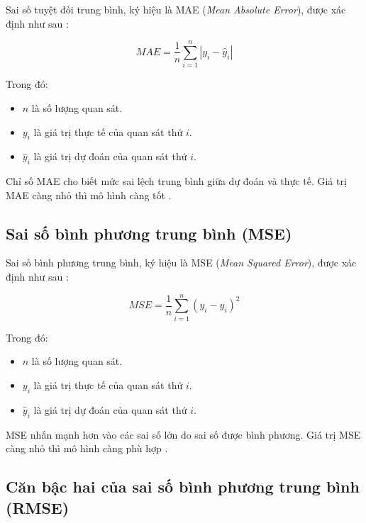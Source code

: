 Sai số tuyệt đối trung bình, ký hiệu là MAE (\textit{Mean Absolute Error}), được xác định như sau \cite{sklearn_userguide}:

\begin{equation}
MAE = \frac{1}{n} \sum_{i=1}^{n} \left| y_i - \hat{y}_i \right|
\label{eq:mae}
\end{equation}

Trong đó:
\begin{itemize}
    \item \(n\) là số lượng quan sát.
    \item \(y_i\) là giá trị thực tế của quan sát thứ \(i\).
    \item \(\hat{y}_i\) là giá trị dự đoán của quan sát thứ \(i\).
\end{itemize}

Chỉ số MAE cho biết mức sai lệch trung bình giữa dự đoán và thực tế. Giá trị MAE càng nhỏ thì mô hình càng tốt \cite{sklearn_userguide}.

\subsection*{\thesubsection\quad Sai số bình phương trung bình (MSE)}

Sai số bình phương trung bình, ký hiệu là MSE (\textit{Mean Squared Error}), được xác định như sau \cite{sklearn_userguide}:

\begin{equation}
MSE = \frac{1}{n} \sum_{i=1}^{n} \left( y_i - \hat{y}_i \right)^2
\label{eq:mse}
\end{equation}

Trong đó:
\begin{itemize}
    \item \(n\) là số lượng quan sát.
    \item \(y_i\) là giá trị thực tế của quan sát thứ \(i\).
    \item \(\hat{y}_i\) là giá trị dự đoán của quan sát thứ \(i\).
\end{itemize}

MSE nhấn mạnh hơn vào các sai số lớn do sai số được bình phương. Giá trị MSE càng nhỏ thì mô hình càng phù hợp \cite{sklearn_userguide}.

\subsection*{\thesubsection\quad Căn bậc hai của sai số bình phương trung bình (RMSE)}

